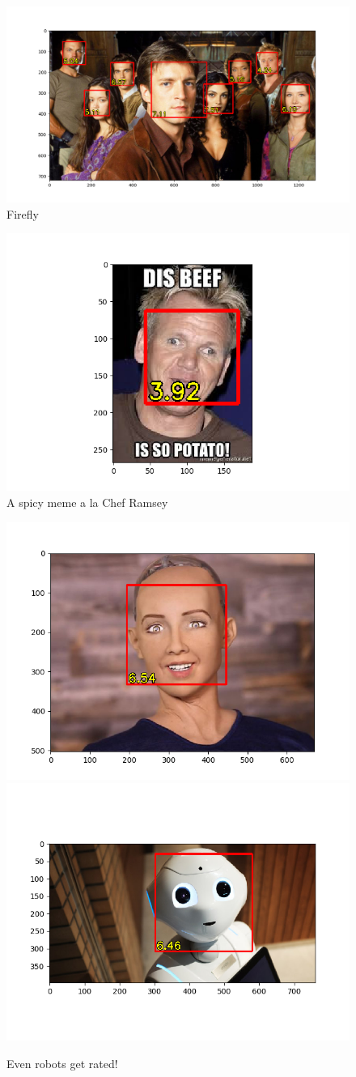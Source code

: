 \documentclass{article}
\begin{document}
\begin{figure}[H]
    \centering
    \includegraphics[width=.8\linewidth]{firefly.png}
    \caption{Firefly}
\end{figure}

\begin{figure}[H]
    \centering
    \includegraphics[width=.7\linewidth]{funny.png}
    \caption{A spicy meme a la Chef Ramsey}
\end{figure}

\begin{figure}[H]
    \centering
    \includegraphics[width=.45\linewidth]{robot1.png}
    \includegraphics[width=.45\linewidth]{robot2.png}
    \caption{Even robots get rated!}
\end{figure}
\end{document}
